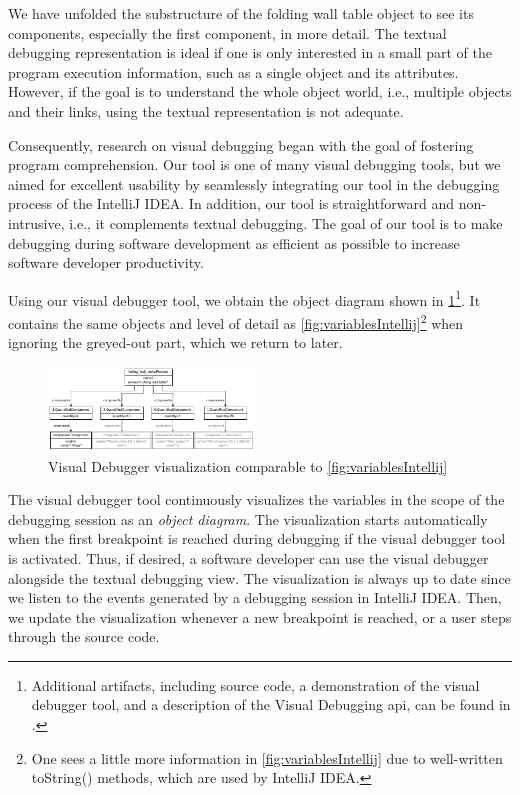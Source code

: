 \documentclass[conference]{IEEEtran}
\newcommand{\intellij}{IntelliJ IDEA}
\begin{document}
We have unfolded the substructure of the \textsf{folding wall table} object to see its components, especially the first component, in more detail.
The textual debugging representation is ideal if one is only interested in a small part of the program execution information, such as a single object and its attributes.
However, if the goal is to understand the whole object world, i.e., multiple objects and their links, using the textual representation is not adequate.

Consequently, research on visual debugging began with the goal of fostering program comprehension.
Our tool is one of many visual debugging tools, but we aimed for excellent usability by seamlessly integrating our tool in the debugging process of the \intellij{}.
In addition, our tool is straightforward and non-intrusive, i.e., it complements textual debugging.
The goal of our tool is to make debugging during software development as efficient as possible to increase software developer productivity.

Using our visual debugger tool, we obtain the object diagram shown in \cref{fig:visualDebuggerVariables}\footnote{\label{footnote:artifacts} Additional artifacts, including source code, a demonstration of the visual debugger tool, and a description of the Visual Debugging \acrshort*{api}, can be found in \cite{timkrauterArtifactsICSME2022}.}.
It contains the same objects and level of detail as \cref{fig:variablesIntellij}\footnote{One sees a little more information in \cref{fig:variablesIntellij} due to well-written \textsf{toString()} methods, which are used by \intellij{}.} when ignoring the greyed-out part, which we return to later.

\begin{figure}[h]
    \centering
    \includegraphics[width=0.489\textwidth]{images/VD-partsList-objects.pdf}
    \caption{Visual Debugger visualization comparable to \cref{fig:variablesIntellij}}
    \label{fig:visualDebuggerVariables}
\end{figure}

The visual debugger tool continuously visualizes the variables in the scope of the debugging session as an \textit{object diagram}.
The visualization starts automatically when the first breakpoint is reached during debugging if the visual debugger tool is activated.
Thus, if desired, a software developer can use the visual debugger alongside the textual debugging view.
The visualization is always up to date since we listen to the events generated by a debugging session in \intellij{}.
Then, we update the visualization whenever a new breakpoint is reached, or a user steps through the source code.
\end{document}
